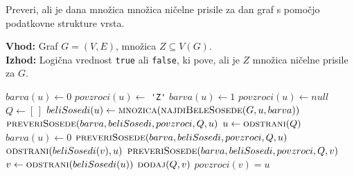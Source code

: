 \documentclass[12pt,a4paper,twoside]{article}
\theoremstyle{definition} %
\theoremstyle{plain} %
\numberwithin{equation}{section}  %
\begin{document}
\begin{algorithm}[!h]
    \caption{Preveri, ali je dana množica množica ničelne prisile za dan graf s pomočjo podatkovne strukture vrsta.}
    \label{alg:preveri-zf-izboljsan}
    \raggedright
    \textbf{Vhod:} Graf $G = (V,E)$, množica $Z \subseteq V(G)$. \\
    \textbf{Izhod:} Logična vrednost \texttt{true} ali \texttt{false}, ki pove, ali je $Z$ množica ničelne prisile za $G$.
    \begin{algorithmic}[1]
        \State $barva(u) \gets 0$ 
        \State $povzroci(u) \gets$ \verb|'Z'|  
        \EndFor
        \State $barva(u) \gets 1$ 
        \State $povzroci(u) \gets null$
        \EndFor
        \State $Q \gets [\,]$ 
          
        \State $beliSosedi(u) \gets \textsc{mnozica}(\Call{najdiBeleSosede}{G, u, barva})$
        \State $\Call{preveriSosede}{barva, beliSosedi, povzroci, Q, u}$
        \EndFor
         
        \State $u \gets \Call{odstrani}{Q}$  
        \State $barva(u) \gets 0$  
        \State $\Call{preveriSosede}{barva, beliSosedi, povzroci, Q, u}$
         
        \State $\Call{odstrani}{beliSosedi(v), u}$ 
        \State $\Call{preveriSosede}{barva, beliSosedi, povzroci, Q, v}$ 
        \EndFor {}
        \EndWhile
        \State \Return {}
        \EndFunction
        \vspace{2mm}
        \State $v \gets \Call{odstrani}{beliSosedi(u)}$ 
          
        \State $\Call{dodaj}{Q, v}$ 
        \State $povzroci(v) = u$  
        \EndIf
        \EndIf
        \EndFunction
    \end{algorithmic}
\end{algorithm}
\end{document}
